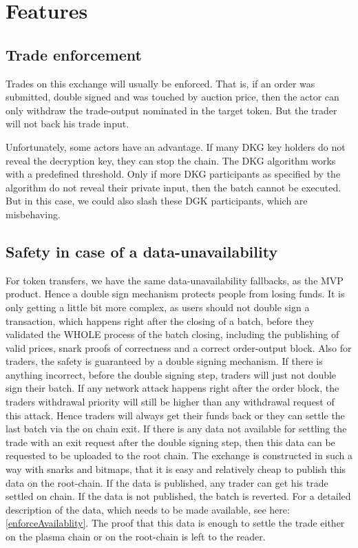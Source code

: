 \documentclass[11pt,parskip=full]{scrartcl}%
\begin{document}
\newpage

\section{Features}

\subsection{Trade enforcement}
Trades on this exchange will usually be enforced. 
That is, if an order was submitted, double signed and was touched by auction price, then the actor can only withdraw the trade-output nominated in the target token. 
But the trader will not back his trade input. 

Unfortunately, some actors have an advantage.
If many DKG key holders do not reveal the decryption key, they can stop the chain. 
The DKG algorithm works with a predefined threshold. 
Only if more DKG participants as specified by the algorithm do not reveal their private input, then the batch cannot be executed. 
But in this case, we could also slash these DGK participants, which are misbehaving. 

\subsection{Safety in case of a data-unavailability}
For token transfers, we have the same data-unavailability fallbacks, as the MVP product. 
Hence a double sign mechanism protects people from losing funds. 
It is only getting a little bit more complex, as users should not double sign a transaction, which happens right after the closing of a batch, before they validated the WHOLE process of the batch closing, including the publishing of valid prices, snark proofs of correctness and a correct order-output block. \newline
Also for traders, the safety is guaranteed by a  double signing mechanism. 
If there is anything incorrect, before the double signing step, traders will just not double sign their batch. 
If any network attack happens right after the order block, the traders withdrawal priority will still be higher than any withdrawal request of this attack. Hence traders will always get their funds back or they can settle the last batch via the on chain exit. 
If there is any data not available for settling the trade with an exit request after the double signing step, then this data can be requested to be uploaded to the root chain. 
The exchange is constructed in such a way with snarks and bitmaps, that it is easy and relatively cheap to publish this data on the root-chain. 
If the data is published, any trader can get his trade settled on chain. If the data is not published, the batch is reverted. 
For a detailed description of the data, which needs to be made available, see here: \ref{enforceAvailablity}. 
The proof that this data is enough to settle the trade either on the plasma chain or on the root-chain is left to the reader. 
\end{document}
